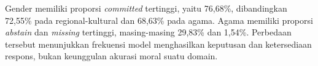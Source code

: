 Gender memiliki proporsi \textit{committed} tertinggi, yaitu 76,68\%,
dibandingkan 72,55\% pada regional-kultural dan 68,63\% pada agama.
Agama memiliki proporsi \textit{abstain} dan \textit{missing} tertinggi,
masing-masing 29,83\% dan 1,54\%.
Perbedaan tersebut menunjukkan frekuensi model menghasilkan keputusan dan
ketersediaan respons, bukan keunggulan akurasi moral suatu domain.
